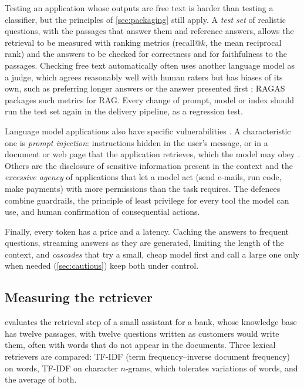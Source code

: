 Testing an application whose outputs are free text is harder than testing a classifier, but the principles of
\cref{sec:packaging} still apply. A \emph{test set} of realistic questions, with the passages that answer them and reference answers,
allows the retrieval to be measured with ranking metrics (recall@$k$, the mean reciprocal rank) and the answers to be checked for
correctness and for faithfulness to the passages. Checking free text automatically often uses another language model as a judge,
which agrees reasonably well with human raters but has biases of its own, such as preferring longer answers or the answer
presented first \citep{zheng2023judging}; RAGAS \citep{es2024ragas} packages such metrics for RAG. Every change of prompt,
model or index should run the test set again in the delivery pipeline, as a regression test.

Language model applications also have specific vulnerabilities \citep{owasp2025llm}. A characteristic one is \emph{prompt
injection}: instructions hidden in the user's message, or in a document or web page that the application retrieves, which the
model may obey \citep{greshake2023not}. Others are the disclosure of sensitive information present in the context and the
\emph{excessive agency} of applications that let a model act (send e-mails, run code, make payments) with more permissions than
the task requires. The defences combine guardrails, the principle of least privilege for every tool the model can use, and human
confirmation of consequential actions.

Finally, every token has a price and a latency. Caching the answers to frequent questions, streaming answers as they are generated,
limiting the length of the context, and \emph{cascades} that try a small, cheap model first and call a large one only when needed
(\cref{sec:cautious}) keep both under control.

\subsection{Measuring the retriever}

 evaluates the retrieval step of a small assistant for a bank, whose knowledge base has twelve passages, with twelve
questions written as customers would write them, often with words that do not appear in the documents. Three lexical retrievers are compared: TF-IDF
(term frequency--inverse document frequency) on words, TF-IDF on character $n$-grams, which tolerates variations of words, and the average of both.

